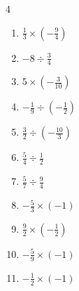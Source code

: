 \begin{multicols}{4}
\begin{enumerate}

  \item $\displaystyle \frac{1}{3}\times{}\left(-\frac{9}{4}\right)$


\columnbreak %

  \item $\displaystyle -8\div{}\frac{3}{4}$


  \item $\displaystyle 5\times{}\left(-\frac{3}{10}\right)$


  \item $\displaystyle -\frac{1}{9}\div{}\left(-\frac{1}{2}\right)$


  \item $\displaystyle \frac{3}{2}\div{}\left(-\frac{10}{3}\right)$


  \item $\displaystyle \frac{5}{4}\div{}\frac{1}{2}$


  \item $\displaystyle \frac{5}{7}\div{}\frac{9}{4}$


  \item $\displaystyle -\frac{5}{3}\times{}\left(-1\right)$


  \item $\displaystyle \frac{9}{2}\times{}\left(-\frac{1}{2}\right)$


  \item $\displaystyle -\frac{5}{9}\times{}\left(-1\right)$


  \item $\displaystyle -\frac{1}{2}\times{}\left(-1\right)$



\end{enumerate}
\end{multicols}
